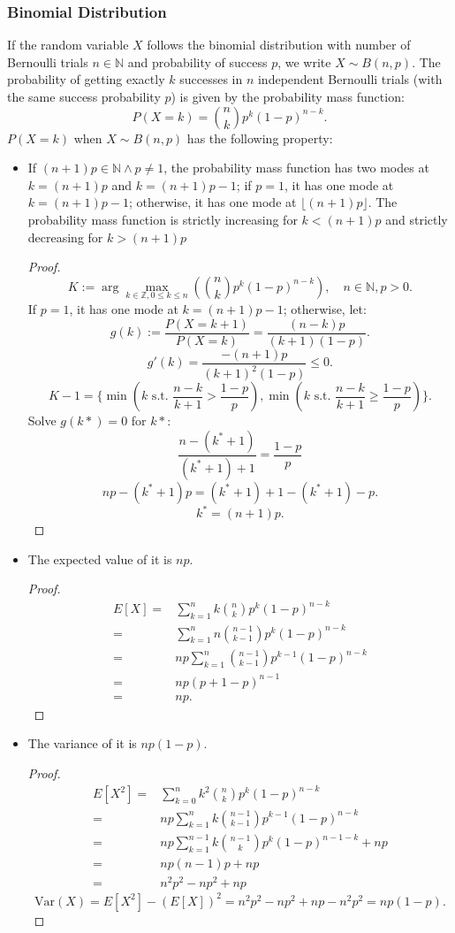 \documentclass[a4paper,12pt]{report}
\begin{document}
\subsubsection{Binomial Distribution}
If the random variable $X$ follows the binomial distribution with number of Bernoulli trials $n\in\mathbb{N}$ and probability of success $p$, we write $X\sim B(n,p)$. The probability of getting exactly $k$ successes in $n$ independent Bernoulli trials (with the same success probability $p$) is given by the probability mass function:
\[P(X=k)=\binom{n}{k}p^k(1-p)^{n-k}.\]
$P(X=k)$ when $X\sim B(n,p)$ has the following property:
\begin{itemize}
\item If $(n+1)p\in\mathbb{N}\land p\neq 1$, the probability mass function has two modes at $k=(n+1)p$ and $k=(n+1)p-1$; if $p=1$, it has one mode at $k=(n+1)p-1$; otherwise, it has one mode at $\lfloor(n+1)p\rfloor$. The probability mass function is strictly increasing for $k<(n+1)p$ and strictly decreasing for $k>(n+1)p$
\begin{proof}
\[K:=\arg\max_{k\in\mathbb{Z},0\leq k\leq n}\left(\binom{n}{k}p^k(1-p)^{n-k}\right),\quad n\in\mathbb{N},p>0.\]
If $p=1$, it has one mode at $k=(n+1)p-1$; otherwise, let:
\[g(k):=\frac{P(X=k+1)}{P(X=k)}=\frac{(n-k)p}{(k+1)(1-p)}.\]
\[g'(k)=\frac{-(n+1)p}{(k+1)^2(1-p)}\leq 0.\]
\[K-1=\{\min\left(k\text{\ s.t.\ }\frac{n-k}{k+1}>\frac{1-p}{p}\right),\min\left(k\text{\ s.t.\ }\frac{n-k}{k+1}\geq\frac{1-p}{p}\right)\}.\]
Solve $g(k*)=0$ for $k*$:
\[\frac{n-(k^*+1)}{(k^*+1)+1}=\frac{1-p}{p}\]
\[np-(k^*+1)p=(k^*+1)+1-(k^*+1)-p.\]
\[k^*=(n+1)p.\]
\end{proof}
\item The expected value of it is $np$.
\begin{proof}
\[\begin{aligned}
E[X]=&\sum_{k=1}^nk\binom{n}{k}p^k(1-p)^{n-k}\\
=&\sum_{k=1}^nn\binom{n-1}{k-1}p^k(1-p)^{n-k}\\
=&np\sum_{k=1}^n\binom{n-1}{k-1}p^{k-1}(1-p)^{n-k}\\
=&np(p+1-p)^{n-1}\\
=&np.
\end{aligned}\]
\end{proof}
\item The variance of it is $np(1-p)$.
\begin{proof}
\[\begin{aligned}
E[X^2]=&\sum_{k=0}^nk^2\binom{n}{k}p^k(1-p)^{n-k}\\
=&np\sum_{k=1}^nk\binom{n-1}{k-1}p^{k-1}(1-p)^{n-k}\\
=&np\sum_{k=1}^{n-1}k\binom{n-1}{k}p^k(1-p)^{n-1-k}+np\\
=&np(n-1)p+np\\
=&n^2p^2-np^2+np
\end{aligned}\]
\[\text{Var}(X)=E[X^2]-(E[X])^2=n^2p^2-np^2+np-n^2p^2=np(1-p).\]
\end{proof}
\end{itemize}
\end{document}
